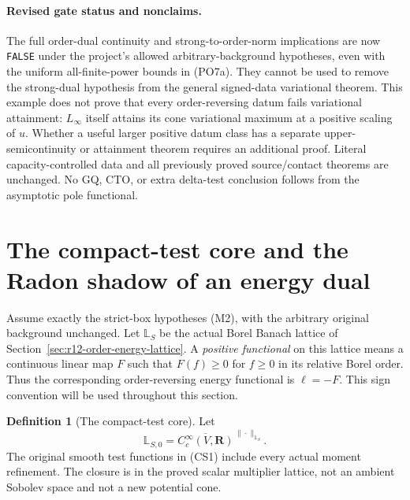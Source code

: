 \documentclass[11pt,a4paper]{article}
\numberwithin{equation}{section}
\theoremstyle{definition}
\newtheorem{definition}[theorem]{Definition}
\theoremstyle{remark}
\begin{document}
\paragraph{Revised gate status and nonclaims.}
The full order-dual continuity and strong-to-order-norm
implications are now \texttt{FALSE} under the project's
allowed arbitrary-background hypotheses, even with the
uniform all-finite-power bounds in \textup{(PO7a)}.  They cannot
be used to remove the strong-dual hypothesis from the
general signed-data variational theorem.  This example
does not prove that every order-reversing datum fails
variational attainment: $L_\infty$ itself attains its
cone variational maximum at a positive scaling of $u$.
Whether a useful larger positive datum class has a
separate upper-semicontinuity or attainment theorem
requires an additional proof.  Literal capacity-controlled
data and all previously proved source/contact theorems
are unchanged.  No GQ, CTO, or extra delta-test conclusion
follows from the asymptotic pole functional.



\section{The compact-test core and the Radon shadow of an energy dual}
\label{sec:r12-compact-test-core}

Assume exactly the strict-box hypotheses (M2), with the arbitrary
original background unchanged. Let $\mathbb L_S$ be the actual Borel
Banach lattice of Section~\ref{sec:r12-order-energy-lattice}. A
\emph{positive functional} on this lattice means a continuous linear
map $F$ such that $F(f)\geq0$ for $f\geq0$ in its relative Borel
order. Thus the corresponding order-reversing energy functional
is $\ell=-F$. This sign convention will be used throughout this
section.

\begin{definition}[The compact-test core]
Let
\[
 \mathbb L_{S,0}
   =\overline{C_c^\infty(V,\mathbf R)}^{\,\|\cdot\|_{\mathbb L_S}} .
 \tag{CS1}
\]
The original smooth test functions in (CS1) include every actual
moment refinement. The closure is in the proved scalar multiplier
lattice, not an ambient Sobolev space and not a new potential cone.
\end{definition}
\end{document}
